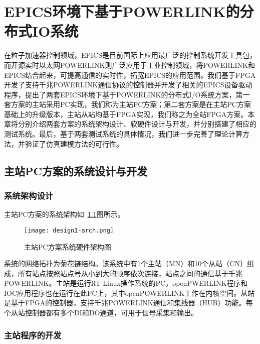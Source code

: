 
\chapter{EPICS环境下基于POWERLINK的分布式IO系统}

在粒子加速器控制领域，EPICS是目前国际上应用最广泛的控制系统开发工具包，而开源实时以太网POWERLINK则广泛应用于工业控制领域，将POWERLINK和EPICS结合起来，可提高通信的实时性，拓宽EPICS的应用范围。我们基于FPGA开发了支持千兆POWERLINK通信协议的控制器并开发了相关的EPICS设备驱动程序，提出了两套EPICS环境下基于POWERLINK的分布式I/O系统方案，第一套方案的主站采用PC实现，我们称为主站PC方案；第二套方案是在主站PC方案基础上的升级版本，主站从站均基于FPGA实现，我们称之为全站FPGA方案。本章将分别介绍两套方案的系统架构设计、软硬件设计与开发，并分别搭建了相应的测试系统。最后，基于两套测试系统的具体情况，我们进一步完善了理论计算方法，并验证了仿真建模方法的可行性。

\section{主站PC方案的系统设计与开发}
\label{section:主站PC方案的系统设计与开发}

\subsection{系统架构设计}
\label{subsection:主站PC方案的系统架构设计}

主站PC方案的系统架构如~\ref{fig:design1-arch}图所示。

\begin{figure}[!htb]
  \centering
  \texttt{[image: design1-arch.png]}
  \caption{主站PC方案系统硬件架构图}
  \label{fig:design1-arch}
\end{figure}

系统的网络拓扑为菊花链结构。该系统中有1个主站（MN）和10个从站（CN）组成，所有站点按照站点号从小到大的顺序依次连接，站点之间的通信基于千兆POWERLINK。主站是运行RT-Linux操作系统的PC，openPWERLINK程序和IOC应用程序也在运行在此PC上，其中openPOWERLINK工作在内核空间。从站是基于FPGA的控制器，支持千兆POWERLINK通信和集线器（HUB）功能。每个从站控制器都有多个DI和DO通道，可用于信号采集和输出\cite{xksun-2019}。

\subsection{主站程序的开发}

